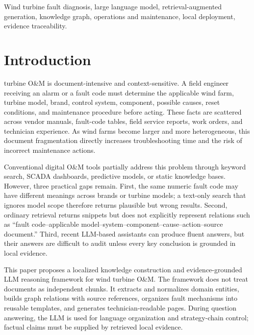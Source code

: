 \documentclass[lettersize,journal]{IEEEtran}
\begin{document}
\begin{IEEEkeywords}
Wind turbine fault diagnosis, large language model, retrieval-augmented generation, knowledge graph, operations and maintenance, local deployment, evidence traceability.
\end{IEEEkeywords}

\section{Introduction}
 turbine O\&M is document-intensive and context-sensitive. A field engineer receiving an alarm or a fault code must determine the applicable wind farm, turbine model, brand, control system, component, possible causes, reset conditions, and maintenance procedure before acting. These facts are scattered across vendor manuals, fault-code tables, field service reports, work orders, and technician experience. As wind farms become larger and more heterogeneous, this document fragmentation directly increases troubleshooting time and the risk of incorrect maintenance actions.

Conventional digital O\&M tools partially address this problem through keyword search, SCADA dashboards, predictive models, or static knowledge bases. However, three practical gaps remain. First, the same numeric fault code may have different meanings across brands or turbine models; a text-only search that ignores model scope therefore returns plausible but wrong results. Second, ordinary retrieval returns snippets but does not explicitly represent relations such as ``fault code--applicable model--system--component--cause--action--source document.'' Third, recent LLM-based assistants can produce fluent answers, but their answers are difficult to audit unless every key conclusion is grounded in local evidence.

This paper proposes a localized knowledge construction and evidence-grounded LLM reasoning framework for wind turbine O\&M. The framework does not treat documents as independent chunks. It extracts and normalizes domain entities, builds graph relations with source references, organizes fault mechanisms into reusable templates, and generates technician-readable pages. During question answering, the LLM is used for language organization and strategy-chain control; factual claims must be supplied by retrieved local evidence.
\end{document}

